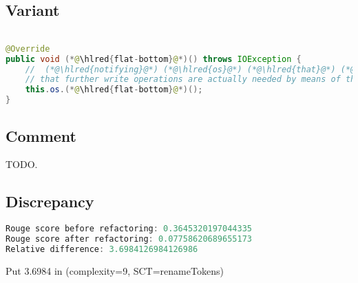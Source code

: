 \documentclass[11pt]{article}
\DeclareRobustCommand{\hlred}[1]{{\sethlcolor{YellowOrange}\hl{#1}}}
\begin{document}
\subsection{Variant}

\begin{lstlisting}[language=java]

@Override
public void (*@\hlred{flat-bottom}@*)() throws IOException {
    //  (*@\hlred{notifying}@*) (*@\hlred{os}@*) (*@\hlred{that}@*) (*@\hlred{this}@*) (*@\hlred{object}@*) (*@\hlred{will}@*) (*@\hlred{flush}@*) (*@\hlred{out}@*) (*@\hlred{data}@*) (*@\hlred{without}@*) (*@\hlred{notice}@*) (*@\hlred{and}@*) (*@\hlred{informing}@*) (*@\hlred{that}@*) (*@\hlred{we}@*) (*@\hlred{can}@*) (*@\hlred{detect}@*) (*@\hlred{when}@*)
    // that further write operations are actually needed by means of the isOverflown() method.
    this.os.(*@\hlred{flat-bottom}@*)();
}
\end{lstlisting}

\subsection{Comment}

TODO.

\subsection{Discrepancy}

\begin{lstlisting}[language=java]
Rouge score before refactoring: 0.3645320197044335
Rouge score after refactoring: 0.07758620689655173
Relative difference: 3.6984126984126986
\end{lstlisting}

Put 3.6984 in (complexity=9, SCT=renameTokens)
\end{document}
